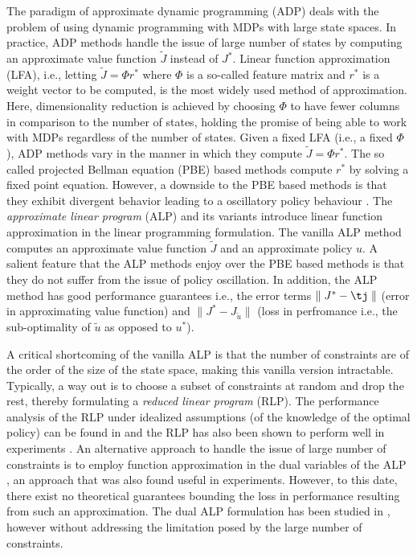 The paradigm of approximate dynamic programming (ADP) deals with the problem of using dynamic programming with MDPs with large state spaces. In practice, ADP methods handle the issue of large number of states by computing an approximate value function $\tilde{J}$ instead of $J^*$.
Linear function approximation (LFA), i.e., letting $\tilde{J}=\Phi r^*$ where $\Phi$ is a so-called feature matrix and $r^*$ is a weight vector to be computed, is the most widely used method of approximation. Here, dimensionality reduction is achieved by choosing $\Phi$ to have fewer columns in comparison to the number of states, holding the promise of being able to work with MDPs regardless of the number of states.
Given a fixed LFA (i.e., a fixed $\Phi$), ADP methods vary in the manner in which they compute $\tilde{J}=\Phi r^*$. The so called projected Bellman equation (PBE) based methods compute $r^*$ by solving a fixed point equation. However, a downside to the PBE based methods is that they exhibit divergent behavior leading to a oscillatory policy behaviour \cite{BertB}. The \emph{approximate linear program} (ALP) \cite{ALP,CS,SALP,ALP-Bor} and its variants introduce linear function approximation in the linear programming formulation. The vanilla ALP method computes an approximate value function $\tilde{J}$ and an approximate policy $u$. A salient feature that the ALP methods enjoy over the PBE based methods is that they do not suffer from the issue of policy oscillation. In addition, the ALP method has good performance guarantees i.e., the error terms $\parallel J^*-\tj\parallel$ (error in approximating value function) and $\parallel J^*-J_{\tilde{u}}\parallel$ (loss in perfromance i.e., the sub-optimality of $\tilde{u}$ as opposed to $u^*$).\par
{}
A critical shortcoming of the vanilla ALP is that the number of constraints are of the order of the size of the state space, making this vanilla version intractable. Typically, a way out is to choose a subset of constraints at random and drop the rest, thereby formulating a \emph{reduced linear program} (RLP). The performance analysis of the RLP under idealized assumptions (of the knowledge of the optimal policy) can be found in \cite{CS} and the RLP has also been shown to perform well in experiments \cite{ALP,CS,CST}. An alternative approach to handle the issue of large number of constraints is to employ function approximation in the dual variables of the ALP \cite{ALP-Bor,dolgov}, an approach that was also found useful in experiments. However, to this date, there exist no theoretical guarantees bounding the loss in performance resulting from such an approximation. The dual ALP formulation has been studied in \cite{abbasi}, however without addressing the limitation posed by the large number of constraints.\par

